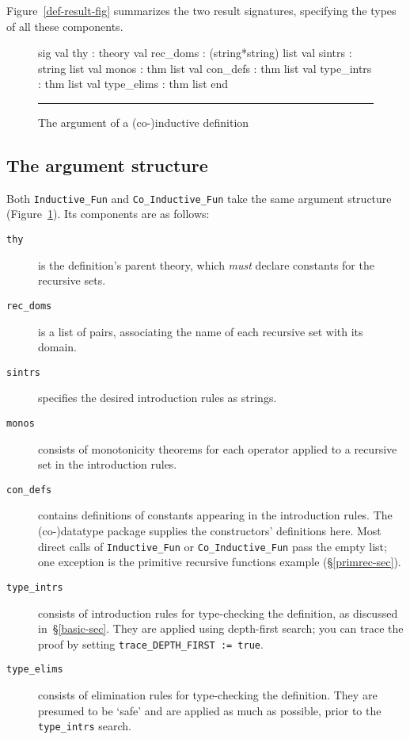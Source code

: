 Figure~\ref{def-result-fig} summarizes the two result signatures,
specifying the types of all these components.

\begin{figure}
\begin{ttbox}
sig  
val thy          : theory
val rec_doms     : (string*string) list
val sintrs       : string list
val monos        : thm list
val con_defs     : thm list
val type_intrs   : thm list
val type_elims   : thm list
end
\end{ttbox}
\hrule
\caption{The argument of a (co-)inductive definition} \label{def-arg-fig}
\end{figure}

\subsection{The argument structure}
Both \verb|Inductive_Fun| and \verb|Co_Inductive_Fun| take the same argument
structure (Figure~\ref{def-arg-fig}).  Its components are as follows:
\begin{description}
\item[\tt thy] is the definition's parent theory, which {\it must\/}
declare constants for the recursive sets.

\item[\tt rec\_doms] is a list of pairs, associating the name of each recursive
set with its domain.

\item[\tt sintrs] specifies the desired introduction rules as strings.

\item[\tt monos] consists of monotonicity theorems for each operator applied
to a recursive set in the introduction rules.

\item[\tt con\_defs] contains definitions of constants appearing in the
introduction rules.  The (co-)datatype package supplies the constructors'
definitions here.  Most direct calls of \verb|Inductive_Fun| or
\verb|Co_Inductive_Fun| pass the empty list; one exception is the primitive
recursive functions example (\S\ref{primrec-sec}).

\item[\tt type\_intrs] consists of introduction rules for type-checking the
  definition, as discussed in~\S\ref{basic-sec}.  They are applied using
  depth-first search; you can trace the proof by setting
  \verb|trace_DEPTH_FIRST := true|.

\item[\tt type\_elims] consists of elimination rules for type-checking the
definition.  They are presumed to be `safe' and are applied as much as
possible, prior to the {\tt type\_intrs} search.
\end{description}
